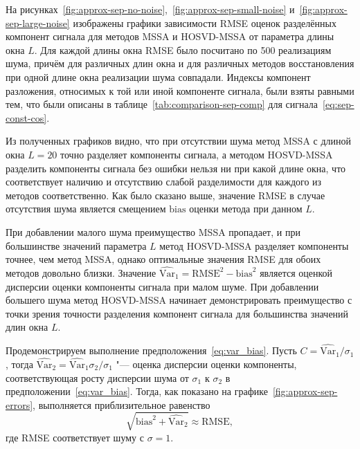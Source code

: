 \documentclass[specialist,
    substylefile = spbu.rtx,
    subf,href,colorlinks=true, 12pt]{disser}
\theoremstyle{plain}
\theoremstyle{definition}
\theoremstyle{remark}
\begin{document}
    На рисунках~\ref{fig:approx-sep-no-noise},~\ref{fig:approx-sep-small-noise} и~\ref{fig:approx-sep-large-noise}
    изображены графики зависимости RMSE оценок разделённых компонент сигнала для методов MSSA и HOSVD-MSSA от
    параметра длины окна $L$.
    Для каждой длины окна RMSE было посчитано по 500 реализациям шума, причём для различных длин окна
    и для различных методов восстановления при одной длине окна реализации шума совпадали.
    Индексы компонент разложения, относимых к той или иной компоненте сигнала, были взяты равными тем, что
    были описаны в таблице~\ref{tab:comparison-sep-comp} для сигнала~\eqref{eq:sep-const-cos}.

    Из полученных графиков видно, что при отсутствии шума метод MSSA с длиной окна $L=20$ точно разделяет
    компоненты сигнала, а методом HOSVD-MSSA разделить компоненты сигнала без ошибки нельзя ни при какой длине окна,
    что соответствует наличию и отсутствию слабой разделимости для каждого из методов соответственно.
    Как было сказано выше, значение RMSE в случае отсутствия шума является смещением $\mathrm{bias}$ 
    оценки метода при данном $L$.

    При добавлении малого шума преимущество MSSA пропадает, и при большинстве значений параметра $L$ метод
    HOSVD-MSSA разделяет компоненты точнее, чем метод MSSA, однако оптимальные значения RMSE для обоих методов
    довольно близки.
    Значение $\widehat{\mathrm{Var}}_1 = \mathrm{RMSE}^2 - \mathrm{bias}^2$ является оценкой дисперсии оценки компоненты сигнала при
    малом шуме.
    При добавлении большего шума метод HOSVD-MSSA начинает демонстрировать преимущество с точки зрения точности
    разделения компонент сигнала для большинства значений длин окна $L$.

    
    Продемонстрируем выполнение предположения~\eqref{eq:var_bias}. 
    Пусть $C=\widehat{\mathrm{Var}}_1 / \sigma_1$,
    тогда $\widehat{\mathrm{Var}}_2 = \widehat{\mathrm{Var}}_1 \sigma_2 / \sigma_1$ "--- оценка дисперсии
    оценки компоненты, соответствующая росту дисперсии шума от $\sigma_1$ к $\sigma_2$ в
    предположении~\eqref{eq:var_bias}.
    Тогда, как показано на графике~\ref{fig:approx-sep-errors}, выполняется приблизительное равенство
    \[
        \sqrt{\mathrm{bias}^2 + \widehat{\mathrm{Var}}_2} \approx \mathrm{RMSE},
    \]
    где RMSE соответствует шуму с $\sigma = 1$.
\end{document}
